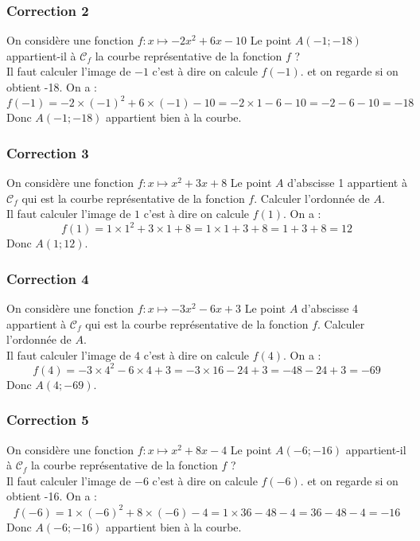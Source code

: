 \documentclass[15pt, mathserif]{beamer}
\begin{document}
\begin{frame}
\vspace{-10mm}
	\frametitle{Correction 2}
On considère une fonction $f : x \mapsto -2x^2+6x-10$ Le point $A(-1;-18 )$ appartient-il à $\mathcal{C}_f$ la courbe représentative de la fonction $f$ ? \\ Il faut calculer l'image de $-1$ c'est à dire on calcule $f(-1)$. et on regarde si on obtient -18. On a : $$ f(-1)=-2\times\left(-1\right)^2+6\times\left(-1\right)-10=-2\times1-6-10=-2-6-10=-18$$ Donc $A( -1;-18) $ appartient bien à la courbe.\end{frame}


\begin{frame}
\vspace{-10mm}
	\frametitle{Correction 3}
On considère une fonction $f : x \mapsto x^2+3x+8$ Le point $A$ d'abscisse 1 appartient à $\mathcal{C}_f$ qui est la courbe représentative de la fonction $f$. Calculer l'ordonnée de $A$. \\ Il faut calculer l'image de $1$ c'est à dire on calcule $f(1)$. On a : $$ f(1)=1\times1^2+3\times1+8=1\times1+3+8=1+3+8=12$$ Donc $A( 1;12)$.\end{frame}


\begin{frame}
\vspace{-10mm}
	\frametitle{Correction 4}
On considère une fonction $f : x \mapsto -3x^2-6x+3$ Le point $A$ d'abscisse 4 appartient à $\mathcal{C}_f$ qui est la courbe représentative de la fonction $f$. Calculer l'ordonnée de $A$. \\ Il faut calculer l'image de $4$ c'est à dire on calcule $f(4)$. On a : $$ f(4)=-3\times4^2-6\times4+3=-3\times16-24+3=-48-24+3=-69$$ Donc $A( 4;-69)$.\end{frame}


\begin{frame}
\vspace{-10mm}
	\frametitle{Correction 5}
On considère une fonction $f : x \mapsto x^2+8x-4$ Le point $A(-6;-16 )$ appartient-il à $\mathcal{C}_f$ la courbe représentative de la fonction $f$ ? \\ Il faut calculer l'image de $-6$ c'est à dire on calcule $f(-6)$. et on regarde si on obtient -16. On a : $$ f(-6)=1\times\left(-6\right)^2+8\times\left(-6\right)-4=1\times36-48-4=36-48-4=-16$$ Donc $A( -6;-16) $ appartient bien à la courbe.\end{frame}
\end{document}
